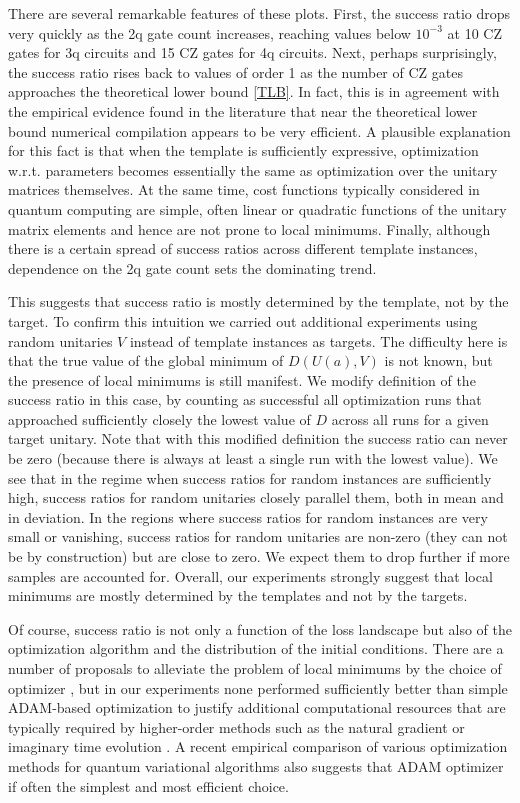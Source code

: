 \documentclass[twocolumn, amsfonts, amssymb, aps, nofootinbib]{revtex4-2}
\newcommand{\CZ}{CZ }
\begin{document}
There are several remarkable features of these plots. First, the success ratio drops very quickly as the 2q gate count increases, reaching values below $10^{-3}$ at 10 \CZ gates for 3q circuits and 15 \CZ gates for 4q circuits. Next, perhaps surprisingly, the success ratio rises back to values of order 1 as the number of \CZ gates approaches the theoretical lower bound \eqref{TLB}. In fact, this is in agreement with the empirical evidence found in the literature \cite{Madden2021, Rakyta2021, Kiani2020} that near the theoretical lower bound numerical compilation appears to be very efficient. A plausible explanation for this fact \cite{Ge2022} is that when the template is sufficiently expressive, optimization w.r.t. parameters becomes essentially the same as optimization over the unitary matrices themselves. At the same time, cost functions typically considered in quantum computing are simple, often linear or quadratic functions of the unitary matrix elements and hence are not prone to local minimums. Finally, although there is a certain spread of success ratios across different template instances, dependence on the 2q gate count sets the dominating trend.

This suggests that success ratio is mostly determined by the template, not by the target. To confirm this  intuition  we carried out additional experiments using random unitaries $V$ instead of template instances as targets. The difficulty here is that the true value of the global minimum of $D(U(a), V)$ is not known, but the presence of local minimums is still manifest. We modify definition of the success ratio in this case, by counting as successful all optimization runs that approached sufficiently closely the lowest value of $D$ across all runs for a given target unitary. Note that with this modified definition the success ratio can never be zero (because there is always at least a single run with the lowest value). We see that in the regime when success ratios for random instances are sufficiently high, success ratios for random unitaries closely parallel them, both in mean and in deviation. In the regions where success ratios for random instances are very small or vanishing, success ratios for random unitaries are non-zero (they can not be by construction) but are close to zero. We expect them to drop further if more samples are accounted for. Overall, our experiments strongly suggest that local minimums are mostly determined by the templates and not by the targets.

Of course, success ratio is not only a function of the loss landscape but also of the optimization algorithm and the distribution of the initial conditions. There are a number of proposals to alleviate the problem of local minimums by the choice of optimizer \cite{Wierichs2020, Rivera-Dean2021}, but in our experiments none performed sufficiently better than simple ADAM\cite{Kingma2015}-based optimization to justify additional computational resources that are typically required by higher-order methods such as the natural gradient \cite{Stokes2020} or imaginary time evolution \cite{Jones2018a}. A recent empirical comparison of various optimization methods for quantum variational algorithms \cite{Lockwood2022} also suggests that ADAM optimizer if often the simplest and most efficient choice.
\end{document}
